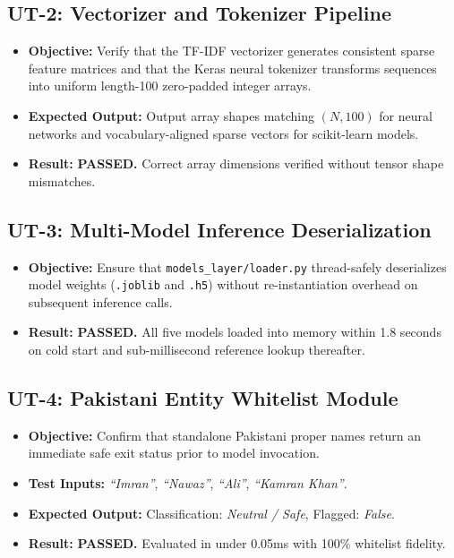 \documentclass[A4paper,12pt]{report}
\theoremstyle{plain}
\theoremstyle{definition}
\theoremstyle{remark}
\numberwithin{equation}{section}
\begin{document}
\subsection{UT-2: Vectorizer and Tokenizer Pipeline}
\begin{itemize}[leftmargin=*]
    \item \textbf{Objective:} Verify that the TF-IDF vectorizer generates consistent sparse feature matrices and that the Keras neural tokenizer transforms sequences into uniform length-100 zero-padded integer arrays.
    \item \textbf{Expected Output:} Output array shapes matching $(N, 100)$ for neural networks and vocabulary-aligned sparse vectors for scikit-learn models.
    \item \textbf{Result:} \textbf{PASSED.} Correct array dimensions verified without tensor shape mismatches.
\end{itemize}

\subsection{UT-3: Multi-Model Inference Deserialization}
\begin{itemize}[leftmargin=*]
    \item \textbf{Objective:} Ensure that \texttt{models\_layer/loader.py} thread-safely deserializes model weights (\texttt{.joblib} and \texttt{.h5}) without re-instantiation overhead on subsequent inference calls.
    \item \textbf{Result:} \textbf{PASSED.} All five models loaded into memory within 1.8 seconds on cold start and sub-millisecond reference lookup thereafter.
\end{itemize}

\subsection{UT-4: Pakistani Entity Whitelist Module}
\begin{itemize}[leftmargin=*]
    \item \textbf{Objective:} Confirm that standalone Pakistani proper names return an immediate safe exit status prior to model invocation.
    \item \textbf{Test Inputs:} \textit{``Imran''}, \textit{``Nawaz''}, \textit{``Ali''}, \textit{``Kamran Khan''}.
    \item \textbf{Expected Output:} Classification: \textit{Neutral / Safe}, Flagged: \textit{False}.
    \item \textbf{Result:} \textbf{PASSED.} Evaluated in under 0.05ms with 100\% whitelist fidelity.
\end{itemize}
\end{document}

